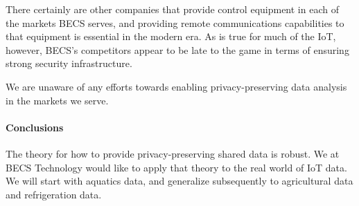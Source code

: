 There certainly are other companies that provide control equipment in
each of the markets BECS serves, and providing remote communications
capabilities to that equipment is essential in the modern era.  As is
true for much of the IoT, however, BECS's competitors appear to be
late to the game in terms of ensuring strong security infrastructure.

We are unaware of any efforts towards enabling privacy-preserving
data analysis in the markets we serve.

\paragraph{Conclusions}
\label{sec:conclude}

The theory for how to provide privacy-preserving shared data is robust.
We at BECS Technology would like to apply that theory to the real world
of IoT data.  We will start with aquatics data, and generalize subsequently
to agricultural data and refrigeration data.

